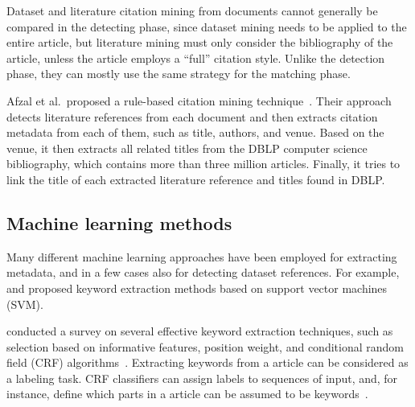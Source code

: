\documentclass{IOS-Book-Article}
\newcommand{\dara}{\textsf{da\textbar ra}}
\begin{document}
Dataset and literature citation mining from documents cannot generally be compared in the detecting phase, since dataset mining needs to be applied to the entire article, but literature mining must only consider the bibliography of the article, unless the article employs a “full” citation style.
Unlike the detection phase, they can mostly use the same strategy for the matching phase. 

Afzal et al.\ proposed a rule-based citation mining technique~\cite{Afzal2010}.
Their approach detects literature references from each document and then extracts citation metadata from each of them, such as title, authors, and venue. Based on the venue, it then extracts all related titles from the DBLP computer science bibliography, which contains more than three million articles.
Finally, it tries to link the title of each extracted literature reference and titles found in DBLP.

\subsection{Machine learning methods}
Many different machine learning approaches have been employed for extracting metadata, and in a few cases also for detecting dataset references.
For example, \citeauthor{Zhang2006} \citeyearpar{Zhang2006} and \citeauthor{Han2003} \citeyearpar{Han2003} proposed keyword extraction methods based on support vector machines (SVM). 

\citeauthor{Kaur2010} conducted a survey on several effective keyword extraction techniques, such as selection based on informative features, position weight, and conditional random field (CRF) algorithms~\citeyearpar{Kaur2010}.
Extracting keywords from a article can be considered as a labeling task.
CRF classifiers can assign labels to sequences of input, and, for instance, define which parts in a article can be assumed to be keywords~\citep{ZHANG2008}.
\end{document}
